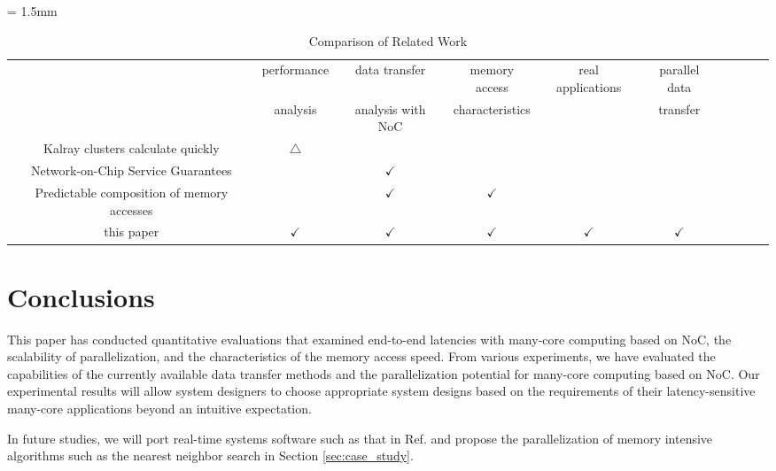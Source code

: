 \documentclass[conference,compsoc]{IEEEtran}
\begin{document}
\begin{table}[t]
  \caption{\label{tb:comparison_relatedwork}
    Comparison of Related Work}
  \centering
  \scriptsize	                    %
  \tabcolsep = 1.5mm              %
  \begin{tabular}{c|ccccccccc}
    \hline
    & performance & data transfer & memory access & \multirow{2}{*}{real applications} & parallel data & \\
    & analysis & analysis with NoC & characteristics & & transfer & \\
    \hline
    \hline
    Kalray clusters calculate quickly \cite{kanter2015kalray} & \(\bigtriangleup\) &  &  &  &  & \\
    Network-on-Chip Service Guarantees \cite{denet2017work} &  & \(\checkmark\) &  &  &  & \\
    Predictable composition of memory accesses \cite{perret2016predictable} &  & \(\checkmark\) & \(\checkmark\) &  &  & \\
    this paper & \(\checkmark\) & \(\checkmark\) & \(\checkmark\) & \(\checkmark\) & \(\checkmark\) & \\
    \hline
  \end{tabular}
  \vspace{-5mm}
\end{table}


\section{Conclusions}
\label{sec:conclusion}
This paper has conducted quantitative evaluations that examined end-to-end latencies with many-core computing based on NoC, the scalability of parallelization, and the characteristics of the memory access speed.
From various experiments, we have evaluated the capabilities of the currently available data transfer methods and the parallelization potential for many-core computing based on NoC.
Our experimental results will allow system designers to choose appropriate system designs based on the requirements of their latency-sensitive many-core applications beyond an intuitive expectation.

In future studies, we will port real-time systems software such as that in Ref. \cite{maruyama2016ros2} and propose the parallelization of memory intensive algorithms such as the nearest neighbor search in Section \ref{sec:case_study}.

% 
% 


\end{document}
